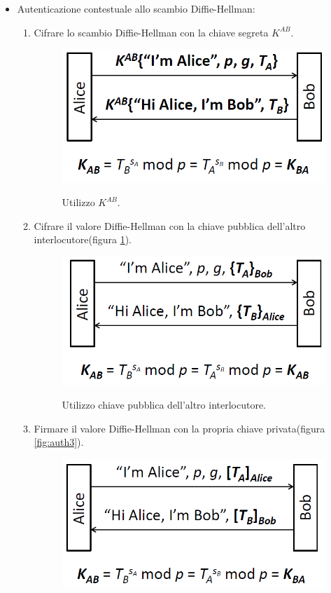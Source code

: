 \begin{itemize}
\item Autenticazione contestuale allo scambio Diffie-Hellman: \begin{enumerate}
\item Cifrare lo scambio Diffie-Hellman con la chiave segreta $K^{AB}$.
\begin{figure}[htbp]
	\centering%
	\subfigure%
	{\includegraphics[scale=0.5, keepaspectratio]{Immagini/chiave_pubblica/DiffieHellman_auth1.png}}
	\caption{Utilizzo $K^{AB}$.}
	\end{figure}
\item Cifrare il valore Diffie-Hellman con la chiave pubblica dell'altro interlocutore(figura \ref{fig:auth2}).
\begin{figure}[htbp]
	\centering%
	\subfigure%
	{\includegraphics[scale=0.5, keepaspectratio]{Immagini/chiave_pubblica/DiffieHellman_auth2.png}}
	\caption{Utilizzo chiave pubblica dell'altro interlocutore.}
	\label{fig:auth2}
	\end{figure}
\item Firmare il valore Diffie-Hellman con la propria chiave privata(figura \ref{fig:auth3}).
\begin{figure}[htbp]
	\centering
	\subfigure
	{\includegraphics[scale=0.5, keepaspectratio]{Immagini/chiave_pubblica/DiffieHellman_auth3.png}}

\end{figure}
\end{enumerate}
\end{itemize}
